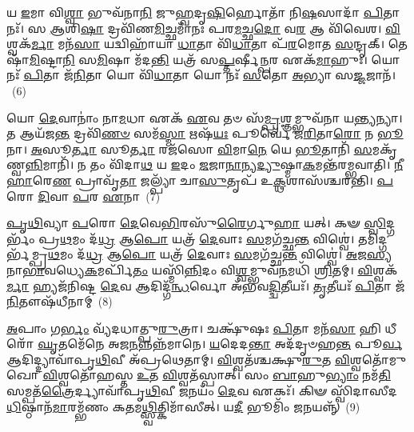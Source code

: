 {\anuvakamend[{𑌉𑌪᳴ \ul{𑌦𑍇}\-𑌵𑌾𑌨𑍍 𑌵𑌟𑍍𑌪𑍍𑌰𑌾᳴\-\ul{𑌣}\-𑌦𑌾𑌶𑍍𑌚𑌤𑍁᳴𑌶𑍍𑌚𑌤𑍍𑌵𑌾𑌰𑌿𑍞𑌶𑌚𑍍𑌚}]}%

𑌯 \ul{𑌇}\-𑌮𑌾 𑌵𑌿\-\ul{𑌶𑍍𑌵𑌾} 𑌭𑍁𑌵᳴𑌨𑌾\-\ul{𑌨𑌿} 𑌜𑍁\-\ul{𑌹𑍍𑌵}\-𑌦𑍃\-\ul{𑌷𑌿}\-𑌰𑍍\mbox{}𑌹𑍋𑌤𑌾᳴ 𑌨𑌿\-\ul{𑌷}\-𑌸𑌾𑌦𑌾᳴ \ul{𑌪𑌿}\-𑌤𑌾 𑌨𑌃᳴। 𑌸 \ul{𑌆}\-𑌶𑌿\-\ul{𑌷𑌾} 𑌦𑍍𑌰𑌵𑌿᳴𑌣\-\ul{𑌮𑌿}\-𑌚𑍍𑌛𑌮𑌾᳴𑌨𑌃 𑌪𑌰\-\ul{𑌮}\-𑌚𑍍𑌛\-\ul{𑌦𑍋} 𑌵\-\ul{𑌰} 𑌆 𑌵𑌿᳴𑌵𑍇𑌶। \ul{𑌵𑌿}\-𑌶𑍍𑌵𑌕᳴\-\ul{𑌰𑍍𑌮𑌾} 𑌮𑌨᳴\-\ul{𑌸𑌾} 𑌯𑌦𑍍𑌵𑌿𑌹𑌾᳴𑌯𑌾 \ul{𑌧𑌾}\-𑌤𑌾 𑌵𑌿᳴\-\ul{𑌧𑌾}\-𑌤𑌾 𑌪᳴\-\ul{𑌰}\-𑌮𑍋𑌤 \ul{𑌸}\-𑌨𑍍𑌦𑍃𑌕𑍍। 𑌤𑍇𑌷𑌾᳴\-\ul{𑌮𑌿}\-𑌷𑍍𑌟𑌾\-\ul{𑌨𑌿} 𑌸\-\ul{𑌮𑌿}\-𑌷𑌾 𑌮᳴𑌦\-\ul{𑌨𑍍𑌤𑌿} 𑌯𑌤𑍍𑌰᳴ 𑌸\-\ul{𑌪𑍍𑌤}\-𑌰𑍍\mbox{}𑌷𑍀\-\ul{𑌨𑍍𑌪}\-𑌰 𑌏𑌕᳴\-\ul{𑌮𑌾}\-𑌹𑍁𑌃। 𑌯𑍋 𑌨𑌃᳴ \ul{𑌪𑌿}\-𑌤𑌾 𑌜᳴\-\ul{𑌨𑌿}\-𑌤𑌾 𑌯𑍋 𑌵𑌿᳴\-\ul{𑌧𑌾}\-𑌤𑌾 𑌯𑍋 𑌨𑌃᳴ \ul{𑌸}\-𑌤𑍋 \ul{𑌅}\-𑌭𑍍𑌯𑌾 𑌸\-\ul{𑌜𑍍𑌜}\-𑌜𑌾𑌨᳴।~(6)

𑌯𑍋 \ul{𑌦𑍇}\-𑌵𑌾𑌨𑌾𑌂॑ 𑌨𑌾\-\ul{𑌮}\-𑌧𑌾 𑌏𑌕᳴ \ul{𑌏}\-𑌵 𑌤𑍞 𑌸᳴\-\ul{𑌮𑍍𑌪𑍍𑌰}\-𑌶𑍍𑌞𑌮𑍍𑌭𑍁𑌵᳴𑌨𑌾 𑌯\-\ul{𑌨𑍍𑌤𑍍𑌯}\-𑌨𑍍𑌯𑌾। 𑌤 𑌆𑌯᳴𑌜\-\ul{𑌨𑍍𑌤} 𑌦𑍍𑌰𑌵𑌿᳴\-\ul{𑌣}\-\-\ul{𑍞} 𑌸𑌮᳴\-\ul{𑌸𑍍𑌮𑌾} 𑌋𑌷᳴\-\ul{𑌯𑌃} 𑌪𑍂𑌰𑍍𑌵𑍇᳴ 𑌜\-\ul{𑌰𑌿}\-𑌤𑌾\-\ul{𑌰𑍋} 𑌨 \ul{𑌭𑍂}\-𑌨𑌾। \ul{𑌅}\-𑌸𑍂\-\ul{𑌰𑍍𑌤𑌾} 𑌸𑍂\-\ul{𑌰𑍍𑌤𑌾} 𑌰𑌜᳴𑌸𑍋 \ul{𑌵𑌿}\-𑌮𑌾\-\ul{𑌨𑍇} 𑌯𑍇 \ul{𑌭𑍂}\-𑌤𑌾𑌨𑌿᳴ \ul{𑌸}\-𑌮𑌕𑍃᳴𑌣𑍍𑌵\-\ul{𑌨𑍍𑌨𑌿}\-𑌮𑌾𑌨𑌿᳴। 𑌨 𑌤𑌂 𑌵𑌿᳴𑌦𑌾\-\ul{𑌥} 𑌯 \ul{𑌇}\-𑌦𑌂 \ul{𑌜}\-𑌜𑌾\-\ul{𑌨𑌾}\-𑌨𑍍𑌯\-\ul{𑌦𑍍𑌯𑍁}\-𑌷𑍍𑌮𑌾\-\ul{𑌕}\-𑌮𑌨𑍍𑌤᳴𑌰𑌮𑍍𑌭𑌵𑌾𑌤𑌿। \ul{𑌨𑍀}\-\-\ul{𑌹𑌾}\-𑌰𑍇\-\ul{𑌣} 𑌪𑍍𑌰𑌾𑌵𑍃᳴\-\ul{𑌤𑌾} 𑌜𑌲𑍍𑌪𑍍𑌯𑌾᳴ 𑌚𑌾\-\ul{𑌸𑍁}\-𑌤𑍃𑌪᳴ 𑌉\-\ul{𑌕𑍍𑌥}\-𑌶𑌾𑌸᳴𑌶𑍍𑌚𑌰𑌨𑍍𑌤𑌿। \ul{𑌪}\-𑌰𑍋 \ul{𑌦𑌿}\-𑌵𑌾 \ul{𑌪}\-𑌰 \ul{𑌏}\-𑌨𑌾~(7)

\-\ul{𑌪𑍃}\-\-\ul{𑌥𑌿}\-𑌵𑍍𑌯𑌾 \ul{𑌪}\-𑌰𑍋 \ul{𑌦𑍇}\-𑌵𑍇\-\ul{𑌭𑌿}\-𑌰𑌸𑍁᳴\-\ul{𑌰𑍈}\-𑌰𑍍𑌗𑍁\-\ul{𑌹𑌾} 𑌯𑌤𑍍। 𑌕𑍟 \ul{𑌸𑍍𑌵𑌿}\-𑌦𑍍𑌗𑌰𑍍𑌭𑌂᳴ 𑌪𑍍𑌰\-\ul{𑌥}\-𑌮𑌂 𑌦᳴\-\ul{𑌧𑍍𑌰} 𑌆\-\ul{𑌪𑍋} 𑌯𑌤𑍍𑌰᳴ \ul{𑌦𑍇}\-𑌵𑌾𑌃 \ul{𑌸}\-𑌮𑌗᳴𑌚𑍍𑌛\-\ul{𑌨𑍍𑌤} 𑌵𑌿𑌶𑍍𑌵𑍇॑। 𑌤𑌮𑌿𑌦𑍍𑌗𑌰𑍍𑌭᳴𑌮𑍍𑌪𑍍𑌰\-\ul{𑌥}\-𑌮𑌂 𑌦᳴\-\ul{𑌧𑍍𑌰} 𑌆\-\ul{𑌪𑍋} 𑌯𑌤𑍍𑌰᳴ \ul{𑌦𑍇}\-𑌵𑌾𑌃 \ul{𑌸}\-𑌮𑌗᳴𑌚𑍍𑌛\-\ul{𑌨𑍍𑌤} 𑌵𑌿𑌶𑍍𑌵𑍇॑। \ul{𑌅}\-𑌜\-\ul{𑌸𑍍𑌯} 𑌨𑌾\-\ul{𑌭𑌾}\-𑌵𑌧𑍍𑌯𑍇\-\ul{𑌕}\-𑌮𑌰𑍍𑌪𑌿᳴\-\ul{𑌤𑌂} 𑌯𑌸𑍍𑌮𑌿᳴\-\ul{𑌨𑍍𑌨𑌿}\-𑌦𑌂 𑌵𑌿\-\ul{𑌶𑍍𑌵}\-𑌮𑍍𑌭𑍁𑌵᳴\-\ul{𑌨}\-\-𑌮𑌧𑌿᳴ \ul{𑌶𑍍𑌰𑌿}\-𑌤𑌮𑍍। \ul{𑌵𑌿}\-𑌶𑍍𑌵𑌕᳴\-\ul{𑌰𑍍𑌮𑌾} 𑌹𑍍𑌯𑌜᳴𑌨𑌿𑌷𑍍𑌟 \ul{𑌦𑍇}\-𑌵 𑌆𑌦𑌿𑌦𑍍𑌗᳴\-\ul{𑌨𑍍𑌧}\-𑌰𑍍𑌵𑍋 𑌅᳴𑌭𑌵\-\ul{𑌦𑍍𑌦𑍍𑌵𑌿}\-𑌤𑍀𑌯𑌃᳴। \ul{𑌤𑍃}\-𑌤𑍀𑌯𑌃᳴ \ul{𑌪𑌿}\-𑌤𑌾 𑌜᳴\-\ul{𑌨𑌿}\-𑌤𑍗𑌷᳴𑌧𑍀𑌨𑌾𑌮𑍍~(8)

\-\ul{𑌅}\-𑌪𑌾𑌂 𑌗\-\ul{𑌰𑍍𑌭𑌂} 𑌵𑍍𑌯᳴𑌦𑌧𑌾𑌤𑍍𑌪𑍁\-\ul{𑌰𑍁}\-𑌤𑍍𑌰𑌾। 𑌚𑌕𑍍𑌷𑍁᳴𑌷𑌃 \ul{𑌪𑌿}\-𑌤𑌾 𑌮𑌨᳴\-\ul{𑌸𑌾} 𑌹𑌿 𑌧𑍀𑌰𑍋᳴ \ul{𑌘𑍃}\-𑌤𑌮𑍇᳴𑌨𑍇 𑌅𑌜\-\ul{𑌨}\-𑌨𑍍𑌨𑌨𑍍𑌨᳴𑌮𑌾𑌨𑍇। \ul{𑌯}\-𑌦𑍇𑌦\-\ul{𑌨𑍍𑌤𑌾} 𑌅𑌦᳴𑌦𑍃𑍞𑌹\-\ul{𑌨𑍍𑌤} 𑌪𑍂\-\ul{𑌰𑍍𑌵} 𑌆𑌦𑌿𑌦𑍍𑌦𑍍𑌯𑌾𑌵𑌾᳴𑌪𑍃\-\ul{𑌥𑌿}\-𑌵𑍀 𑌅᳴𑌪𑍍𑌰𑌥𑍇𑌤𑌾𑌮𑍍। \ul{𑌵𑌿}\-𑌶𑍍𑌵𑌤᳴𑌶𑍍𑌚𑌕𑍍𑌷𑍁\-\ul{𑌰𑍁}\-𑌤 \ul{𑌵𑌿}\-𑌶𑍍𑌵𑌤𑍋᳴𑌮𑍁𑌖𑍋 \ul{𑌵𑌿}\-𑌶𑍍𑌵𑌤𑍋᳴𑌹𑌸𑍍𑌤 \ul{𑌉}\-𑌤 \ul{𑌵𑌿}\-𑌶𑍍𑌵𑌤᳴𑌸𑍍𑌪𑌾𑌤𑍍। 𑌸𑌂 \ul{𑌬𑌾}\-𑌹𑍁\-\ul{𑌭𑍍𑌯𑌾𑌂} 𑌨𑌮᳴\-\ul{𑌤𑌿} 𑌸𑌮𑍍𑌪𑌤᳴\-\ul{𑌤𑍍𑌰𑍈}\-𑌰𑍍𑌦𑍍𑌯𑌾𑌵𑌾᳴𑌪𑍃\-\ul{𑌥𑌿}\-𑌵𑍀 \ul{𑌜}\-𑌨𑌯𑌂᳴ \ul{𑌦𑍇}\-𑌵 𑌏𑌕𑌃᳴। 𑌕𑌿𑍟 𑌸𑍍𑌵𑌿᳴𑌦𑌾𑌸𑍀𑌦\-\ul{𑌧𑌿}\-𑌷𑍍𑌠𑌾𑌨᳴\-\ul{𑌮𑌾}\-𑌰𑌮𑍍𑌭᳴𑌣𑌂 𑌕\-\ul{𑌤}\-𑌮\-\ul{𑌥𑍍𑌸𑍍𑌵𑌿}\-𑌤𑍍𑌕𑌿𑌮𑌾᳴𑌸𑍀𑌤𑍍। 𑌯\-\ul{𑌦𑍀} 𑌭𑍂𑌮𑌿𑌂᳴ \ul{𑌜}\-𑌨𑌯𑌨𑍍𑌨𑍍᳴~(9)

